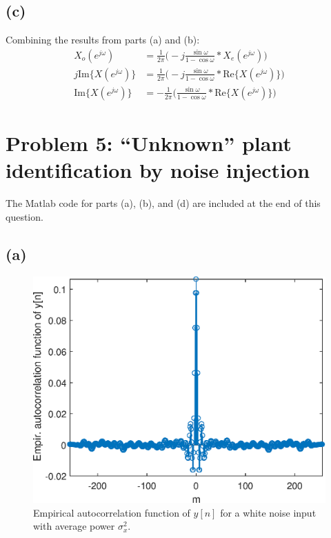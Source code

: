 \documentclass{article}
\begin{document}
\subsection{(c)}

Combining the results from parts (a) and (b):
\begin{align}
X_o(e^{j\omega}) &= \frac{1}{2\pi}\Big(-j\frac{\sin\omega}{1-\cos\omega}\ast X_e(e^{j\omega})\Big) \tag{from part (b)} \\
j\mathrm{Im}\{X(e^{j\omega})\} &= \frac{1}{2\pi}\Big(-j\frac{\sin\omega}{1-\cos\omega}\ast \mathrm{Re}\{X(e^{j\omega})\}\Big) \tag{from part (a)} \\
\mathrm{Im}\{X(e^{j\omega})\} &= -\frac{1}{2\pi}\Big(\frac{\sin\omega}{1-\cos\omega}\ast \mathrm{Re}\{X(e^{j\omega})\}\Big)
\end{align}

\section{Problem 5: ``Unknown'' plant identification by noise injection}

The Matlab code for parts (a), (b), and (d) are included at the end of this question.

\subsection{(a)}
\FloatBarrier
\begin{figure}[h!]
	\centering
	\includegraphics[scale=0.7]{figs/hw04_q3a_emp_xcorr.eps}
	\caption{Empirical autocorrelation function of $y[n]$ for a white noise input with average power $\sigma_x^2$.}
\end{figure}
\FloatBarrier
\end{document}
